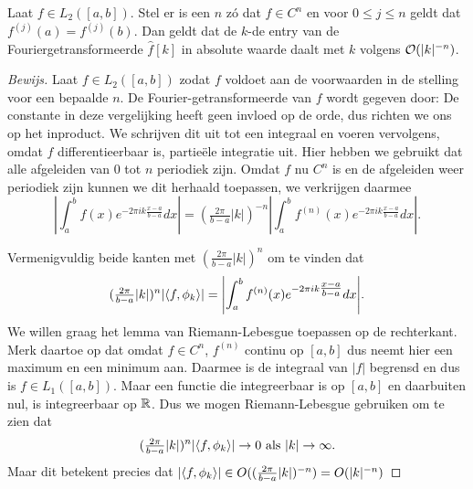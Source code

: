 \begin{stelling}
  Laat $f \in L_2([a,b])$. Stel er is een $n$ z\'o dat $f \in C^n$ en voor $0\leq j\leq n$ geldt dat $f^{(j)}(a) = f^{(j)}(b)$. Dan geldt dat de $k$-de entry van de Fouriergetransformeerde $\hat f[k]$ in absolute waarde
  daalt met $k$ volgens $\mathcal{O}(|k|^{-n})$.
\end{stelling}
\begin{proof}[Bewijs]
  Laat $f \in L_2([a,b])$ zodat $f$ voldoet aan de voorwaarden in de stelling voor een bepaalde $n$.
  De Fourier-getransformeerde van $f$ wordt gegeven door:
  De constante in deze vergelijking heeft geen invloed op de orde, dus richten we ons op het inproduct.
  We schrijven dit uit tot een integraal en voeren vervolgens, omdat $f$ differentieerbaar is, partie\"ele
  integratie uit.
  Hier hebben we gebruikt dat alle afgeleiden van $0$ tot $n$ periodiek zijn.
  Omdat $f$ nu $C^n$ is en de afgeleiden weer periodiek zijn kunnen we dit herhaald toepassen,
  we verkrijgen daarmee
  \[
  \left| \int_a^b f(x) e^{-2 \pi i k \tfrac{x-a}{b-a}} dx \right|
  = (\tfrac{2 \pi}{b-a} |k|)^{-n}\left| \int_a^b f^{(n)}(x) e^{- 2 \pi i k \tfrac{x-a}{b-a}} dx \right|.
  \]

  Vermenigvuldig beide kanten met $(\tfrac{2 \pi}{b-a} |k|)^n$ om te vinden dat
  \[
  (\tfrac{2 \pi}{b-a} |k|)^n {\left| \langle f , \phi_k \rangle \right|}
  = {\left| \int_a^b f^{(n)}(x) e^{- 2 \pi i k \tfrac{x-a}{b-a}} dx \right|}.
  \]
  We willen graag het lemma van Riemann-Lebesgue toepassen op de rechterkant.
  Merk daartoe op dat omdat $f \in C^n$, $f^{(n)}$ continu op $[a,b]$
  dus neemt hier een maximum en een minimum aan.
  Daarmee is de integraal van $|f|$ begrensd en dus is $f\in L_1([a,b])$.
  Maar een functie die integreerbaar is op $[a,b]$ en daarbuiten nul, is integreerbaar op $\mathbb{R}$.
  Dus we mogen Riemann-Lebesgue gebruiken om te zien dat
  \[
  (\tfrac{2 \pi}{b-a} |k|)^n {\left| \langle f , \phi_k \rangle \right|} \to 0 \text{ als } |k| \to \infty.
  \]
  Maar dit betekent precies dat ${\left| \langle f , \phi_k \rangle \right|} \in  O((\tfrac{2 \pi}{b-a} |k|)^{-n}) = O(|k|^{-n})$
\end{proof}

